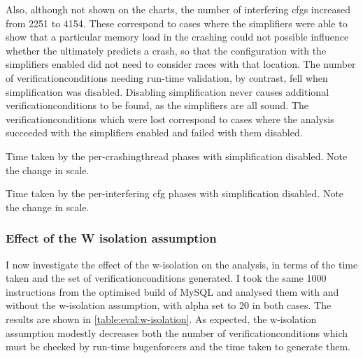 Also, although not shown on the charts, the number of interfering
\glspl{cfg} increased from 2251 to 4154.  These correspond to cases
where the simplifiers were able to show that a particular memory load
in the crashing {\StateMachine} could not possible influence whether
the {\StateMachine} ultimately predicts a crash, so that the
configuration with the simplifiers enabled did not need to consider
races with that location.  The number of \glspl{verificationcondition}
needing run-time validation, by contrast, fell when simplification was
disabled.  Disabling simplification never causes additional
\glspl{verificationcondition} to be found, as the simplifiers are all
sound.  The \glspl{verificationcondition} which were lost correspond
to cases where the analysis succeeded with the simplifiers enabled and
failed with them disabled.

\begin{sanefig}
  \caption{Time taken by the per-\gls{crashingthread} phases with
    {\StateMachine} simplification disabled.  Note the change in
    scale.}
  \label{fig:eval:time_breakdown:crashing_no_simple}
\end{sanefig}

\begin{sanefig}
  \caption{Time taken by the per-interfering \gls{cfg} phases with
    {\StateMachine} simplification disabled.  Note the change in
    scale.}
  \label{fig:eval:time_breakdown:interfering_no_simple}
\end{sanefig}

\subsubsection{Effect of the W isolation assumption}
\label{sect:eval:w_isolation}


I now investigate the effect of the \gls{w-isolation} on the analysis,
in terms of the time taken and the set of
\glspl{verificationcondition} generated.  I took the same 1000
instructions from the optimised build of MySQL and analysed them with
and without the \gls{w-isolation} assumption, with \gls{alpha} set to
20 in both cases.  The results are shown in
\autoref{table:eval:w-isolation}.  As expected, the \gls{w-isolation}
assumption modestly decreases both the number of
\glspl{verificationcondition} which must be checked by run-time
\glspl{bugenforcer} and the time taken to generate them.

